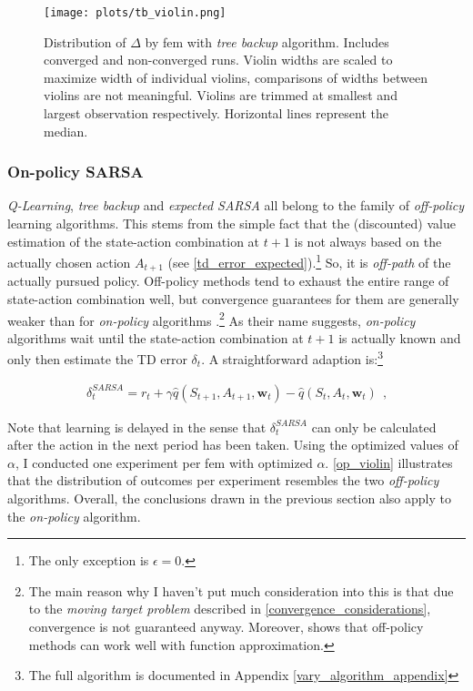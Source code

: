 \begin{figure}
	\texttt{[image: plots/tb\_violin.png]}
	\caption[Distribution of $\Delta$ by \gls{fem} with \emph{tree backup} algorithm]{Distribution of $\Delta$ by \gls{fem} with \emph{tree backup} algorithm. Includes converged and non-converged runs. Violin widths are scaled to maximize width of individual violins, comparisons of widths between violins are not meaningful. Violins are trimmed at smallest and largest observation respectively. Horizontal lines represent the median.}
	\label{tb_violin}
\end{figure}

\subsubsection{On-policy SARSA}
\emph{Q-Learning}, \emph{tree backup} and \emph{expected SARSA} all belong to the family of \emph{off-policy} learning algorithms. This stems from the simple fact that the (discounted) value estimation of the state-action combination at $t+1$ is not always based on the actually chosen action $A_{t+1}$ (see \autoref{td_error_expected}).\footnote{The only exception is $\epsilon = 0$.}  So, it is \emph{off-path} of the actually pursued policy. Off-policy methods tend to exhaust the entire range of state-action combination well, but convergence guarantees for them are generally weaker than for \emph{on-policy} algorithms \parencite[p.257-265]{sutton_reinforcement_2018}.\footnote{The main reason why I haven't put much consideration into this is that due to the \emph{moving target problem} described in \autoref{convergence_considerations}, convergence is not guaranteed anyway. Moreover, \textcite{hettich_algorithmic_2021} shows that off-policy methods can work well with function approximation.} As their name suggests, \emph{on-policy} algorithms wait until the state-action combination at $t+1$ is actually known and only then estimate the TD error $\delta_t$. A straightforward adaption is:\footnote{The full algorithm is documented in Appendix \ref{vary_algorithm_appendix}}

\begin{gather}\label{td_error_on_policy}
\delta_t^{SARSA} = r_t + \gamma \hat{q}(S_{t+1}, A_{t+1}, \boldsymbol{w}_t) - \hat{q}(S_t, A_t, \boldsymbol{w}_t) ~~ \text{,}
\end{gather}

Note that learning is delayed in the sense that $\delta_t^{SARSA}$ can only be calculated after the action in the next period has been taken. Using the optimized values of $\alpha$, I conducted one experiment per \gls{fem} with optimized $\alpha$. \autoref{op_violin} illustrates that the distribution of outcomes per experiment resembles the two \emph{off-policy} algorithms. Overall, the conclusions drawn in the previous section also apply to the \emph{on-policy} algorithm.

